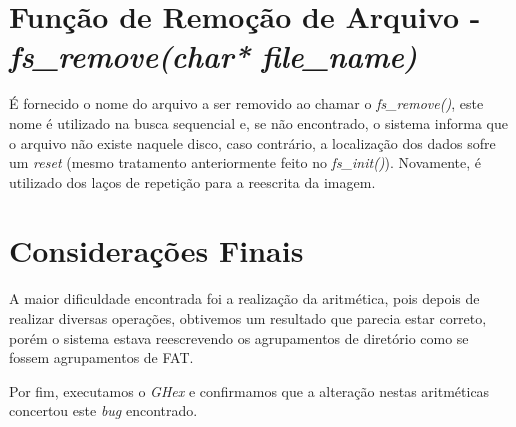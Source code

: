 \documentclass[11pt]{article}
\begin{document}
\section{Função de Remoção de Arquivo - \textit{fs\_remove(char* file\_name)}}
\par
É fornecido o nome do arquivo a ser removido ao chamar o \textit{fs\_remove()}, este nome é utilizado na busca sequencial e, se não encontrado, o sistema informa que o arquivo não existe naquele disco, caso contrário, a localização dos dados sofre um \textit{reset} (mesmo tratamento anteriormente feito no \textit{fs\_init()}). Novamente, é utilizado dos laços de repetição para a reescrita da imagem.
 

\section{Considerações Finais}
\par
A maior dificuldade encontrada foi a realização da aritmética, pois depois de realizar diversas operações, obtivemos um resultado que parecia estar correto, porém o sistema estava reescrevendo os agrupamentos de diretório como se fossem agrupamentos de FAT.
\par
Por fim, executamos o \textit{GHex} e confirmamos que a alteração nestas aritméticas concertou este \textit{bug} encontrado.
\end{document}
